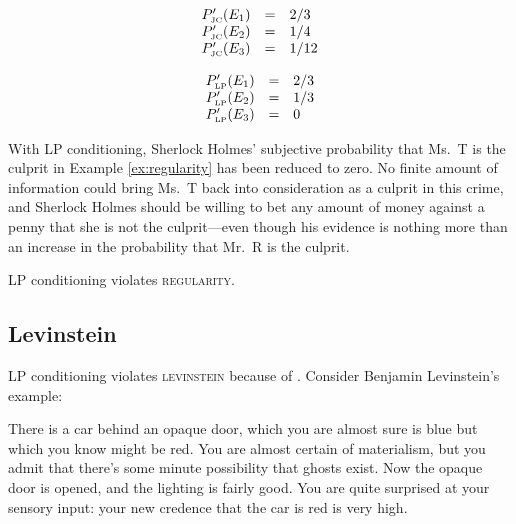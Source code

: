 \documentclass[11pt]{article}
\begin{document}
\begin{equation}
  \label{eq:sherlockposteriorjcreg}
  \begin{array}{rcl}
  P'_{\mbox{\tiny JC}}(E_{1})&=&2/3\\
  P'_{\mbox{\tiny JC}}(E_{2})&=&1/4\\
  P'_{\mbox{\tiny JC}}(E_{3})&=&1/12
\end{array}
\end{equation}

\begin{equation}
  \label{eq:sherlockposteriorlpreg}
  \begin{array}{rcl}
  P'_{\mbox{\tiny LP}}(E_{1})&=&2/3\\
  P'_{\mbox{\tiny LP}}(E_{2})&=&1/3\\
  P'_{\mbox{\tiny LP}}(E_{3})&=&0
\end{array}
\end{equation}

With LP conditioning, Sherlock Holmes' subjective probability that
Ms.\ T is the culprit in Example \ref{ex:regularity} has been reduced
to zero. No finite amount of information could bring Ms.\ T back into
consideration as a culprit in this crime, and Sherlock Holmes should
be willing to bet any amount of money against a penny that she is not
the culprit---even though his evidence is nothing more than an
increase in the probability that Mr.\ R is the culprit.

LP conditioning violates \textsc{regularity}.

\subsection{Levinstein}
\label{Levinstein}

LP conditioning violates \textsc{levinstein} because of 
. Consider Benjamin Levinstein's example:

\begin{quotex}
  \label{ex:levinstein} There is a car
  behind an opaque door, which you are almost sure is blue but which
  you know might be red. You are almost certain of materialism, but
  you admit that there's some minute possibility that ghosts exist.
  Now the opaque door is opened, and the lighting is fairly good. You
  are quite surprised at your sensory input: your new credence that
  the car is red is very high.
\end{quotex}
\end{document}
